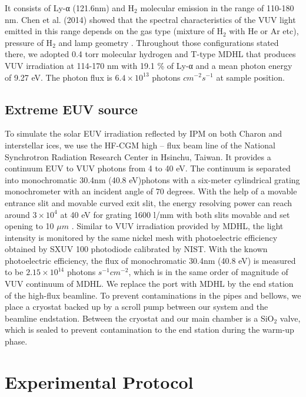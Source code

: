It consists of Ly-α (121.6nm) and H$_2$ molecular emission in the range of 110-180 nm. Chen et al. (2014) showed that the spectral characteristics of the VUV light emitted in this range depends on the gas type (mixture of H$_2$ with He or Ar etc), pressure of H$_2$ and lamp geometry \cite{chen2013vacuum}. Throughout those configurations stated there, we adopted 0.4 torr molecular hydrogen and T-type MDHL that produces VUV irradiation at 114-170 nm with 19.1 \% of Ly-α and a mean photon energy of 9.27 eV. The photon flux is $6.4 \times 10^{13}$ photons $cm^{-2} s^{-1}$ at sample position.

\subsection{Extreme EUV source}
\label{sec:Extreme_EUV_source}

To simulate the solar EUV irradiation reflected by IPM on both Charon and interstellar ices, we use the HF-CGM high – flux beam line of the National Synchrotron Radiation Research Center in Hsinchu, Taiwan. It provides a continuum EUV to VUV photons from 4 to 40 eV. The continuum is separated into monochromatic 30.4nm (40.8 eV)photons with a six-meter cylindrical grating monochrometer with an incident angle of 70 degrees. With the help of a movable entrance slit and movable curved exit slit, the energy resolving power can reach around $3 \times 10^4$ at 40 eV for grating 1600 l/mm with both slits movable and set opening to 10 $\mu m$ \cite{hsieh1998design}. Similar to VUV irradiation provided by MDHL, the light intensity is monitored by the same nickel mesh with photoelectric efficiency obtained by SXUV 100 photodiode calibrated by NIST. With the known photoelectric efficiency, the flux of monochromatic 30.4nm (40.8 eV) is measured to be $2.15 \times 10^{14}$ photons $s^{-1} cm^{-2}$, which is in the same order of magnitude of VUV continuum of MDHL. We replace the port with MDHL by the end station of the high-flux beamline. To prevent contaminations in the pipes and bellows, we place a cryostat backed up by a scroll pump between our system and the beamline endstation. Between the cryostat and our main chamber is a SiO$_2$ valve, which is sealed to prevent contamination to the end station during the warm-up phase.

\section{Experimental Protocol}
\label{sec:Experimental_Protocol}


